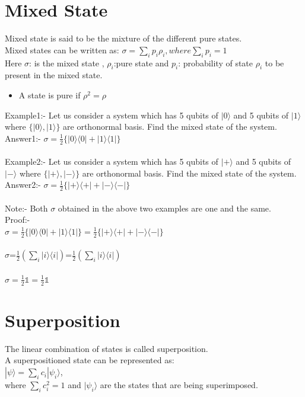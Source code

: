 \documentclass{article}
\begin{document}
\section{Mixed State}
Mixed state is said to be the mixture of the different pure states.\\
Mixed states can be written as:
$\sigma=\sum\limits_{i}p_{i}\rho_{i} , where \sum\limits_{i}p_{i}=1$\\
Here $\sigma$: is the mixed state , $\rho_{i}$:pure state and $p_{i}$: probability of state $\rho_{i}$ to be present in the mixed state.
\begin{itemize}
	\item A state is pure if $\rho^2=\rho$
\end{itemize}
Example1:-
Let us consider a system which has 5 qubits of $|0\rangle$ and 5 qubits of $|1\rangle$ where $\{|0\rangle,|1\rangle\}$ are orthonormal basis. Find the mixed state of the system.\\
Answer1:- $\sigma=\frac{1}{2}\{|0\rangle\langle0|+|1\rangle\langle1|\}$\\\\
Example2:-
Let us consider a system which has 5 qubits of $|+\rangle$ and 5 qubits of $|-\rangle$ where $\{|+\rangle,|-\rangle\}$ are orthonormal basis. Find the mixed state of the system.\\
Answer2:- $\sigma=\frac{1}{2}\{|+\rangle\langle+|+|-\rangle\langle-|\}$\\\\
Note:- Both $\sigma$ obtained in the above two examples are one and the same.\\
Proof:-\\
$\sigma=\frac{1}{2}\{|0\rangle\langle0|+|1\rangle\langle1|\}=\frac{1}{2}\{|+\rangle\langle+|+|-\rangle\langle-|\}$\\\\
$\sigma$=$\frac{1}{2}(\sum\limits_{i}|i\rangle\langle i|)$=$\frac{1}{2}(\sum\limits_{i}|i\rangle\langle i|)$\\\\
$\sigma=\frac{1}{2}\mathbb{1}=\frac{1}{2}\mathbb{1}$

\section{Superposition}
The linear combination of states is called superposition.\\
A superpositioned state can be represented as:\\
$|\psi\rangle=\sum\limits_{i}c_{i}|\psi_{i}\rangle$,\\
where $\sum\limits_{i}c_{i}^2=1$ and $|\psi_{i}\rangle$ are the states that are being superimposed.
\end{document}

